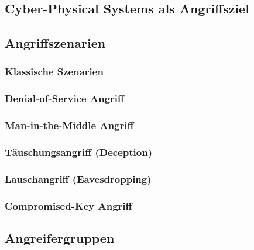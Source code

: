 \documentclass[final,bibliography=totocnumbered]{include/sikseminar}
\begin{document}

\subsection{Cyber-Physical Systems als Angriffsziel}\label{subsec:angriffsziel}

\subsection{Angriffszenarien}\label{subsec:angriffszenarien}
\subsubsection{Klassische Szenarien}
\subsubsection{Denial-of-Service Angriff}
\subsubsection{Man-in-the-Middle Angriff}
\subsubsection{T\"auschungsangriff (Deception)} %
\subsubsection{Lauschangriff (Eavesdropping)} %
\subsubsection{Compromised-Key Angriff}

\subsection{Angreifergruppen}\label{subsec:angreifergruppen}
\end{document}
